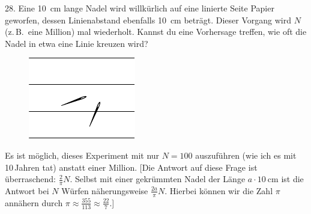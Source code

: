 \begin{problem}{28.}
	Eine \SI{10}{\cm} lange Nadel wird willkürlich auf eine linierte Seite Papier geworfen, dessen Linienabstand ebenfalls \SI{10}{\cm} beträgt. Dieser Vorgang wird $N$ (z.\,B.\ eine Million) mal wiederholt. 
	Kannst du eine Vorhersage treffen, wie oft die Nadel in etwa eine Linie kreuzen wird?
	\begin{figure}
		\includegraphics{taskbook-12}
	\end{figure}
	Es ist möglich, dieses Experiment mit nur $N=100$ auszuführen (wie ich es mit 10\,Jahren tat) anstatt einer Million. [Die Antwort auf diese Frage ist überraschend: $\frac2{\pi}N$. Selbst mit einer gekrümmten Nadel der Länge $a \cdot \SI{10}{\cm}$ ist die Antwort bei $N$ Würfen näherungsweise $\frac{2a}{\pi}N$. 
	Hierbei können wir die Zahl $\pi$ annähern durch $\pi \approx \frac{355}{113} \approx \frac{22}7$.]
\end{problem}

